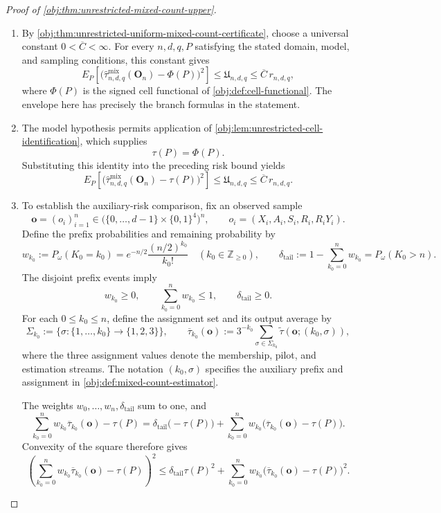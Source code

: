 \documentclass[11pt]{article}
\begin{document}
\begin{proof}[Proof of \cref{obj:thm:unrestricted-mixed-count-upper}]
\begin{enumerate}
\item By \cref{obj:thm:unrestricted-uniform-mixed-count-certificate}, choose a universal constant \(0<\overline C<\infty\). For every \(n,d,q,P\) satisfying the stated domain, model, and sampling conditions, this constant gives
\[
E_P\!\left[
 \bigl(\widehat\tau^{\mathrm{mix}}_{n,d,q}(\mathbf O_n)-\Phi(P)\bigr)^2
\right]
\le \mathfrak U_{n,d,q}
\le \overline C\,r_{n,d,q},
\]
where \(\Phi(P)\) is the signed cell functional of
\cref{obj:def:cell-functional}. The envelope here has precisely the branch formulas in the statement.

\item The model hypothesis permits application of
\cref{obj:lem:unrestricted-cell-identification}, which supplies
\[
\tau(P)=\Phi(P).
\]
Substituting this identity into the preceding risk bound yields
\[
E_P\!\left[
 \bigl(\widehat\tau^{\mathrm{mix}}_{n,d,q}(\mathbf O_n)-\tau(P)\bigr)^2
\right]
\le \mathfrak U_{n,d,q}
\le \overline C\,r_{n,d,q}.
\]

\item To establish the auxiliary-risk comparison, fix an observed sample
\[
\mathbf o=(o_i)_{i=1}^n
\in
\bigl(\{0,\ldots,d-1\}\times\{0,1\}^{4}\bigr)^n,
\qquad
o_i=(X_i,A_i,S_i,R_i,R_iY_i).
\]
Define the prefix probabilities and remaining probability by
\[
w_{k_0}:=P_\omega(K_0=k_0)
=e^{-n/2}\frac{(n/2)^{k_0}}{k_0!}
\quad(k_0\in\mathbb Z_{\ge0}),
\qquad
\delta_{\mathrm{tail}}
:=1-\sum_{k_0=0}^{n}w_{k_0}
=P_\omega(K_0>n).
\]
The disjoint prefix events imply
\[
w_{k_0}\ge0,\qquad
\sum_{k_0=0}^{n}w_{k_0}\le1,\qquad
\delta_{\mathrm{tail}}\ge0.
\]
For each \(0\le k_0\le n\), define the assignment set and its output average by
\[
\Sigma_{k_0}
:=\bigl\{\sigma:\{1,\ldots,k_0\}\to\{1,2,3\}\bigr\},
\qquad
\overline\tau_{k_0}(\mathbf o)
:=3^{-k_0}\sum_{\sigma\in\Sigma_{k_0}}
 \widetilde\tau(\mathbf o;(k_0,\sigma)),
\]
where the three assignment values denote the membership, pilot, and estimation streams. The notation \((k_0,\sigma)\) specifies the auxiliary prefix and assignment in \cref{obj:def:mixed-count-estimator}.

The weights \(w_0,\ldots,w_n,\delta_{\mathrm{tail}}\) sum to one, and
\[
\sum_{k_0=0}^{n}w_{k_0}\overline\tau_{k_0}(\mathbf o)-\tau(P)
=
\delta_{\mathrm{tail}}\bigl(-\tau(P)\bigr)
+\sum_{k_0=0}^{n}w_{k_0}
 \bigl(\overline\tau_{k_0}(\mathbf o)-\tau(P)\bigr).
\]
Convexity of the square therefore gives
\[
\left(
 \sum_{k_0=0}^{n}w_{k_0}\overline\tau_{k_0}(\mathbf o)-\tau(P)
\right)^2
\le
\delta_{\mathrm{tail}}\tau(P)^2
+\sum_{k_0=0}^{n}w_{k_0}
 \bigl(\overline\tau_{k_0}(\mathbf o)-\tau(P)\bigr)^2.
\]


\end{enumerate}
\end{proof}
\end{document}
